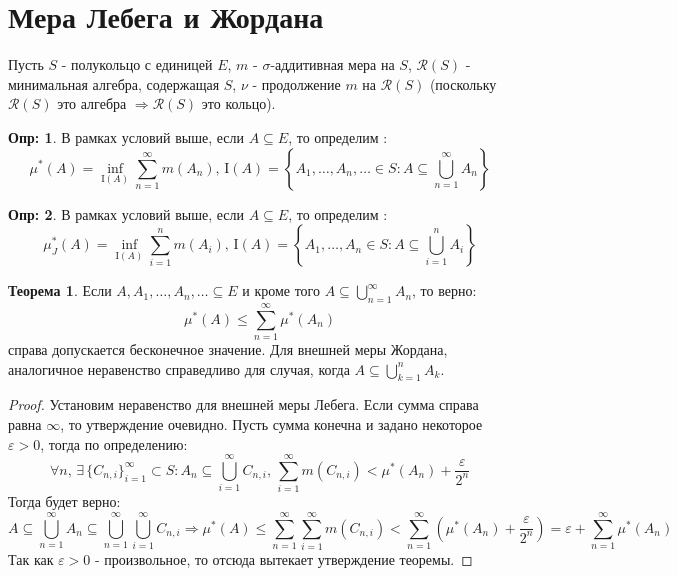 \documentclass[12pt]{article}
\newcommand{\MI}{\mathrm{I}}
\newcommand{\MCR}{\mathcal{R}}
\newcommand{\VE}{\varepsilon}
\theoremstyle{definition}
\newtheorem{defn}{Опр:}
\newtheorem{theorem}{Теорема}
\begin{document}
\section*{Мера Лебега и Жордана}
Пусть $S$ - полукольцо с единицей $E$, $m$ - $\sigma$-аддитивная мера на $S$, $\MCR(S)$ - минимальная алгебра, содержащая $S$, $\nu$ - продолжение $m$ на $\MCR(S)$ (поскольку $\MCR(S)$ это алгебра $\Rightarrow \MCR(S)$ это кольцо).

\begin{defn}
	В рамках условий выше, если $A \subseteq E$, то определим :
	$$
	\mu^*(A) = \inf\limits_{\MI(A)}\sum\limits_{n = 1}^{\infty}m(A_n) ,\, \MI(A) = \left\{A_1, \dotsc, A_n, \dotsc \in S \colon A \subseteq \bigcup\limits_{n = 1}^{\infty}A_n \right\} 
	$$
\end{defn}
\begin{defn}
	В рамках условий выше, если $A \subseteq E$, то определим :
	$$
	\mu_J^*(A) = \inf\limits_{\MI(A)}\sum\limits_{i = 1}^{n}m(A_i) ,\, \MI(A) = \left\{A_1, \dotsc, A_n \in S \colon A \subseteq \bigcup\limits_{i = 1}^{n}A_i \right\} 
	$$
\end{defn}
\begin{theorem}
	Если $A, A_1, \dotsc, A_n, \dotsc \subseteq E$ и кроме того $A \subseteq \bigcup\limits_{n = 1}^{\infty}A_n$, то верно:
	$$
		\mu^*(A) \leq \sum\limits_{n = 1}^{\infty} \mu^*(A_n)
	$$
	справа допускается бесконечное значение. Для внешней меры Жордана, аналогичное неравенство справедливо для случая, когда $A \subseteq \bigcup\limits_{k = 1}^{n}A_k$.
\end{theorem}
\begin{proof}
	Установим неравенство для внешней меры Лебега. Если сумма справа равна $\infty$, то утверждение очевидно. Пусть сумма конечна и задано некоторое $\VE > 0$, тогда по определению:
	$$
		\forall n, \, \exists \, \{C_{n,i}\}_{i = 1}^{\infty} \subset S \colon A_n \subseteq \bigcup\limits_{i = 1}^{\infty} C_{n,i}, \, \sum\limits_{i = 1}^{\infty}m(C_{n,i}) < \mu^*(A_n) + \dfrac{\VE}{2^n}
	$$
	Тогда будет верно: 
	$$
		A \subseteq \bigcup\limits_{n = 1}^{\infty}A_n \subseteq \bigcup\limits_{n = 1}^{\infty}\bigcup\limits_{i = 1}^{\infty} C_{n,i} \Rightarrow \mu^*(A) \leq \sum\limits_{n = 1}^{\infty} \sum\limits_{i = 1}^{\infty}m(C_{n,i}) < \sum\limits_{n = 1}^{\infty} \left(\mu^*(A_n) + \dfrac{\VE}{2^n}\right) = \VE + \sum\limits_{n = 1}^{\infty} \mu^*(A_n)
	$$ 
	Так как $\VE > 0$ - произвольное, то отсюда вытекает утверждение теоремы.
\end{proof}
\end{document}
